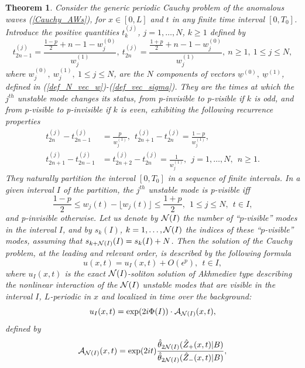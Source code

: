 \documentclass[12pt]{article}
\newtheorem{theorem}{Theorem}
\newcommand{\beq}{\begin{equation}}
\newcommand{\eeq}{\end{equation}}
\begin{document}
\begin{theorem} Consider the generic periodic Cauchy problem of the anomalous waves (\ref{Cauchy_AWs}), for $x\in [0,L]$ and $t$ in any finite time interval $[0,T_0]$. Introduce the positive quantities $t^{(j)}_{k}$, $j=1,\ldots,N$, $k\ge 1$ defined by
\begin{equation}
\label{eq:change_times} 
t^{(j)}_{2n-1}= \frac{\frac{1-p}{2} + n-1 - w^{(0)}_j }{w^{(1)}_j }, \ t^{(j)}_{2n}= \frac{\frac{1+p}{2} + n - 1 - w^{(0)}_j }{w^{(1)}_j }, \ n\ge 1, \ 1\le j \le N,
\end{equation}
where $w^{(0)}_j,\ w^{(1)}_j, \ 1\le j \le N$, are the $N$ components of vectors $\underline{w}^{(0)},\ \underline{w}^{(1)}$, defined in (\ref{def_N_vec_w})-(\ref{def_vec_sigma}). They are the times at which the $j^{th}$ unstable mode changes its status, from p-invisible to p-visible if $k$ is odd, and from p-visible to p-invisible if $k$ is even, exhibiting the following recurrence properties 
\begin{align}
\label{eq:Nrecurrence}
t^{(j)}_{2n}-t^{(j)}_{2n-1} &= \frac{p}{w^{(1)}_j}, \ \ t^{(j)}_{2n+1}-t^{(j)}_{2n} = \frac{1-p}{w^{(1)}_j},\\
t^{(j)}_{2n+1}-t^{(j)}_{2n-1} &=  t^{(j)}_{2n+2}-t^{(j)}_{2n} = \frac{1}{w^{(1)}_j}, \ \ j=1,\ldots,N, \ \ n\ge 1.\nonumber
\end{align}
They naturally partition the interval $[0,T_0]$ in a sequence of finite intervals.
In a given interval $I$ of the partition, the  $j^{th}$ unstable mode is p-visible iff
\beq
\frac{1-p}{2} \le w_j(t) - \lfloor  w_j(t) \rfloor \le \frac{1+p}{2}, \ \ 1\le j \le N, \ \ t\in I,
\eeq
and p-invisible otherwise. Let us denote by ${\cal N}(I)$ the number of ``$p$-visible'' modes in the interval $I$, and by $s_k(I)$, $k=1,\ldots,{\cal N}(I)$ the indices of these ``$p$-visible'' modes, assuming that $s_{k+{\cal N}(I)}(I)= s_k(I)+N$.  
Then the solution of the Cauchy problem, at the leading and relevant order, is described by the following formula 
\beq\label{sol_approx}
u(x,t) = u_I(x,t) + O(\epsilon^p),  \ \ t\in I,   
\eeq
where $u_I(x,t)$ is the exact ${\cal N}(I)$-soliton solution of Akhmediev type describing the nonlinear interaction of the ${\cal N}(I)$ unstable modes that are visible in the interval $I$, $L$-periodic in $x$ and localized in time over the background:
$$
u_I(x,t)=\exp(2i\Phi(I)) \cdot {\cal A}_{{\cal N}(I)}(x,t),
$$
defined by
\begin{equation}
\label{eq:Akh_CS}
{\cal A}_{{\cal N}(I)}(x,t)   =\exp(2it) \frac{\hat\theta_{2{\cal N}(I)}(\hat Z_{+}(x,t)|B)}{\hat\theta_{2{\cal N}(I)}(\hat Z_{-}(x,t)|B )}, 

\end{equation}
\end{theorem}
\end{document}
